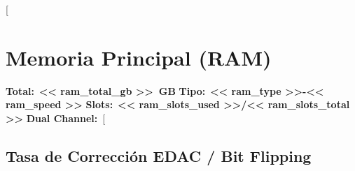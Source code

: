\documentclass[11pt, a4paper, final]{article}
\newcommand{\makebadge}[2]{%
  \tikz[baseline=-0.65ex, inner sep=0pt]\node[ %
    fill=#1, text=white,
    font=\bfseries\scriptsize,
    inner xsep=4pt, inner ysep=2pt,
    rounded corners=0pt
  ]{#2};%
}
\newcommand{\badgeok}  {\makebadge{StatusOK}{OPTIMAL}}
\newcommand{\badgefail}{\makebadge{StatusCrit}{CRITICAL}}
\newcommand{\mv}[1]{\textcolor{AMPrimary}{\textbf{#1}}}
\begin{document}
[%

\newpage


\section{Memoria Principal (RAM)}

\begin{componentinfo}
  \small
  \textbf{Total:}\ \mv{<< ram_total_gb >>\ GB}\hfill
  \textbf{Tipo:}\ \mv{<< ram_type >>-<< ram_speed >>}\hfill
  \textbf{Slots:}\ \mv{<< ram_slots_used >>/<< ram_slots_total >>}\hfill
  \textbf{Dual Channel:}\ [%
\end{componentinfo}

\vspace{0.5cm}


\subsection{Tasa de Corrección EDAC / Bit Flipping}
\end{document}
